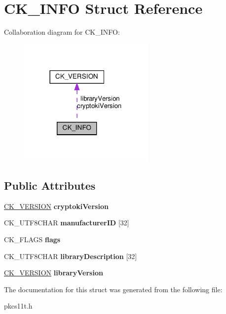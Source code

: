 \hypertarget{struct_c_k___i_n_f_o}{}\section{C\+K\+\_\+\+I\+N\+FO Struct Reference}
\label{struct_c_k___i_n_f_o}


Collaboration diagram for C\+K\+\_\+\+I\+N\+FO\+:
\nopagebreak
\begin{figure}[H]
\begin{center}
\leavevmode
\includegraphics[width=189pt]{struct_c_k___i_n_f_o__coll__graph}
\end{center}
\end{figure}
\subsection*{Public Attributes}
\begin{DoxyCompactItemize}
\item 
\mbox{\label{struct_c_k___i_n_f_o_a261d5c79ab4a3579b71aa6df7a69cad5}} 
\hyperlink{struct_c_k___v_e_r_s_i_o_n}{C\+K\+\_\+\+V\+E\+R\+S\+I\+ON} {\bfseries cryptoki\+Version}
\item 
\mbox{\label{struct_c_k___i_n_f_o_ab58e8e4d98ad72aaaa59cad2cc85ea80}} 
C\+K\+\_\+\+U\+T\+F8\+C\+H\+AR {\bfseries manufacturer\+ID} \mbox{[}32\mbox{]}
\item 
\mbox{\label{struct_c_k___i_n_f_o_abac745e390f6328a4a75310d0af2c72a}} 
C\+K\+\_\+\+F\+L\+A\+GS {\bfseries flags}
\item 
\mbox{\label{struct_c_k___i_n_f_o_ac90912a7de0400710fa8a6cf9c8a5dfe}} 
C\+K\+\_\+\+U\+T\+F8\+C\+H\+AR {\bfseries library\+Description} \mbox{[}32\mbox{]}
\item 
\mbox{\label{struct_c_k___i_n_f_o_a6a0708856568d8d64a9da330d2e217a6}} 
\hyperlink{struct_c_k___v_e_r_s_i_o_n}{C\+K\+\_\+\+V\+E\+R\+S\+I\+ON} {\bfseries library\+Version}
\end{DoxyCompactItemize}


The documentation for this struct was generated from the following file\+:\begin{DoxyCompactItemize}
\item 
pkcs11t.\+h\end{DoxyCompactItemize}
